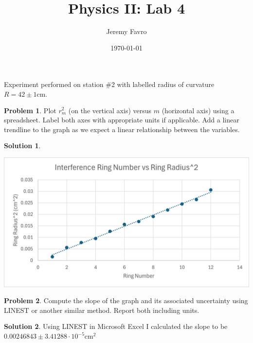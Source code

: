 \documentclass[10pt]{article}
\title{Physics II: Lab 4}
\author{Jeremy Favro}
\date{\today}
\theoremstyle{definition}
\newtheorem{problem}{Problem}
\newtheorem{soln}{Solution}
\begin{document}
\maketitle

\noindent Experiment performed on station \#2 with labelled radius of curvature $R=42\pm 1$cm.

\begin{problem}
Plot $r_m^2$ (on the vertical axis) versus $m$ (horizontal axis) using a spreadsheet. Label both axes with appropriate units if applicable. Add a linear trendline
to the graph as we expect a linear relationship between the variables.
\end{problem}
\begin{soln} ~\\
  \begin{center}
    \includegraphics{Picture1.png}
  \end{center}
\end{soln}

\begin{problem}
Compute the slope of the graph and its associated uncertainty using LINEST or another similar method. Report both including units.
\end{problem}
\begin{soln}
  Using LINEST in Microsoft Excel I calculated the slope to be $0.00246843\pm3.41288\cdot 10^{-5} \text{cm}^2$
\end{soln}
\end{document}
